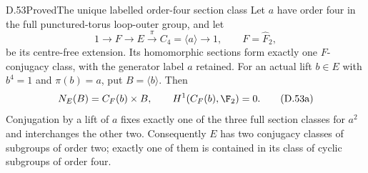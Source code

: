 \begin{claim}{D.53}{Proved}{The unique labelled order-four section class}
Let $a$ have order four in the full punctured-torus
loop-outer group, and let
\[
          1\longrightarrow F\longrightarrow E
             \xrightarrow{\;\pi\;}C_4=\langle a\rangle
             \longrightarrow1,\qquad F=\widehat F_2,
\]
be its centre-free extension. Its homomorphic
sections form exactly one $F$-conjugacy class,
with the generator label $a$ retained.
For an actual lift $b\in E$ with
$b^4=1$ and $\pi(b)=a$, put $B=\langle b\rangle$.
Then
\[
       N_E(B)=C_F(b)\times B,\qquad
                         H^1(C_F(b),\F_2)=0.            \tag{D.53a}
\]
Conjugation by a lift of $a$ fixes exactly one
of the three full section classes for $a^2$
and interchanges the other two.
Consequently $E$ has two conjugacy classes
of subgroups of order two; exactly one of
them is contained in its class of cyclic
subgroups of order four.
\end{claim}
